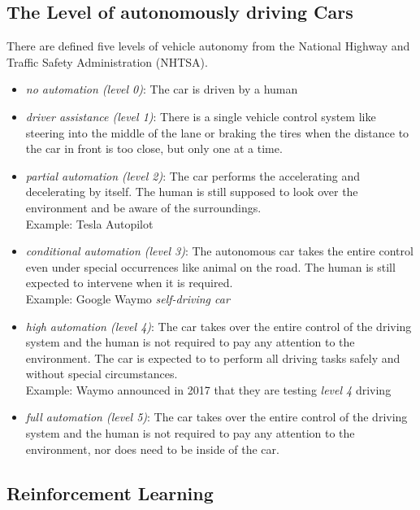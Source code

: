 \documentclass[journal]{IEEEtran}
\begin{document}
\subsection{The Level of autonomously driving Cars}

There are defined five levels of vehicle autonomy from the National Highway and Traffic Safety Administration (NHTSA).

\begin{itemize}
\item \textit{no automation (level 0)}: The car is driven by a human
\item \textit{driver assistance (level 1)}: There is a single vehicle control system like steering into the middle of the lane or braking the tires when the distance to the car in front is too close, but only one at a time.
 \item \textit{partial automation (level 2)}: The car performs the accelerating and decelerating by itself. The human is still supposed to look over the environment and be aware of the surroundings. \\
Example: Tesla Autopilot \cite{tesla}	
\item \textit{conditional automation (level 3)}: The autonomous car takes the entire control even under special occurrences like animal on the road. The human is still expected to intervene when it is required. \\
Example: Google Waymo \textit{self-driving car} \cite{google}
\item \textit{high automation (level 4)}: The car takes over the entire control of the driving system and the human is not required to pay any attention to the environment. The car is expected to to perform all driving tasks safely and without special circumstances. \\
Example: Waymo announced in 2017 that they are testing \textit{level 4} driving \cite{google2}
\item \textit{full automation (level 5)}: The car takes over the entire control of the driving system and the human is not required to pay any attention to the environment, nor does need to be inside of the car. 



\end{itemize}

\subsection{Reinforcement Learning}
\end{document}
